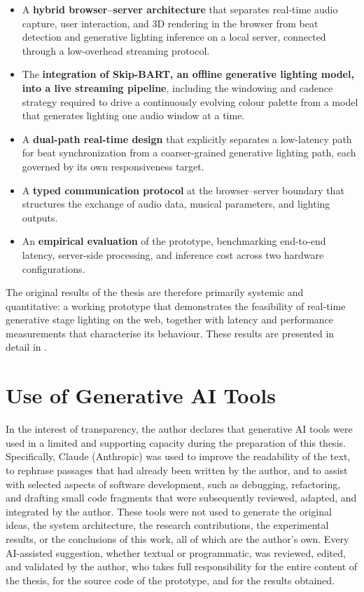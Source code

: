 \begin{itemize}
    \item A \textbf{hybrid browser--server architecture} that separates real-time audio capture, user interaction, and 3D rendering in the browser from beat detection and generative lighting inference on a local server, connected through a low-overhead streaming protocol.
    \item The \textbf{integration of Skip-BART, an offline generative lighting model, into a live streaming pipeline}, including the windowing and cadence strategy required to drive a continuously evolving colour palette from a model that generates lighting one audio window at a time.
    \item A \textbf{dual-path real-time design} that explicitly separates a low-latency path for beat synchronization from a coarser-grained generative lighting path, each governed by its own responsiveness target.
    \item A \textbf{typed communication protocol} at the browser--server boundary that structures the exchange of audio data, musical parameters, and lighting outputs.
    \item An \textbf{empirical evaluation} of the prototype, benchmarking end-to-end latency, server-side processing, and inference cost across two hardware configurations.
\end{itemize}

The original results of the thesis are therefore primarily systemic and quantitative: a working prototype that demonstrates the feasibility of real-time generative stage lighting on the web, together with latency and performance measurements that characterise its behaviour. These results are presented in detail in .

\section{Use of Generative AI Tools}

In the interest of transparency, the author declares that generative AI tools were used in a limited and supporting capacity during the preparation of this thesis. Specifically, Claude (Anthropic) was used to improve the readability of the text, to rephrase passages that had already been written by the author, and to assist with selected aspects of software development, such as debugging, refactoring, and drafting small code fragments that were subsequently reviewed, adapted, and integrated by the author. These tools were not used to generate the original ideas, the system architecture, the research contributions, the experimental results, or the conclusions of this work, all of which are the author's own. Every AI-assisted suggestion, whether textual or programmatic, was reviewed, edited, and validated by the author, who takes full responsibility for the entire content of the thesis, for the source code of the prototype, and for the results obtained.

